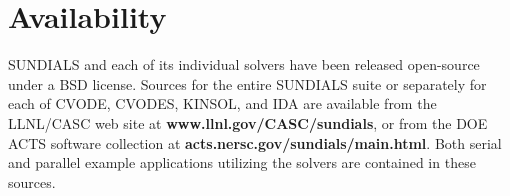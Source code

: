 \section{Availability}
\label{s:availability}

SUNDIALS and each of its individual solvers have been released open-source
under a BSD license.
Sources for the entire SUNDIALS suite or separately for each of CVODE, 
CVODES, KINSOL, and IDA are available from the LLNL/CASC web site at
\newline \hspace*{.5in} {\bf www.llnl.gov/CASC/sundials},
\newline or from the DOE ACTS software collection at
\newline \hspace*{.5in} {\bf acts.nersc.gov/sundials/main.html}.
\newline
Both serial and parallel example applications utilizing the solvers 
are contained in these sources. 





